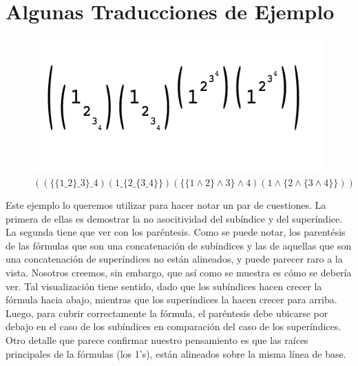 \newpage

\section{Algunas Traducciones de Ejemplo}

\begin{figure}[H]
      \begin{centering}
        \includegraphics{imgs/a}
        \caption{$((\{\{1\_2\}\_3\}\_4)(1\_\{2\_\{3\_4\}\})(\{\{1\wedge2\}\wedge3\}\wedge4)(1\wedge\{2\wedge\{3\wedge4\}\}))$}
       \end{centering}
\end{figure}

\indent Este ejemplo lo queremos utilizar para hacer notar un par de cuestiones. La primera de ellas es demostrar la no asocitividad del subíndice y del superíndice. La segunda tiene que ver con los paréntesis. Como se puede notar, los parentésis de las fórmulas que son una concatenación de subíndices y las de aquellas que son una concatenación de superíndices no están alineados, y puede parecer raro a la vista. Nosotros creemos, sin embargo, que así como se muestra es cómo se debería ver. Tal visualización tiene sentido, dado que los subíndices hacen crecer la fórmula hacia abajo, mientras que los superíndices la hacen crecer para arriba. Luego, para cubrir correctamente la fórmula, el paréntesis debe ubicarse por debajo en el caso de los subíndices en comparación del caso de los superíndices. Otro detalle que parece confirmar nuestro pensamiento es que las raíces principales de la fórmulas (los 1's), están alineados sobre la misma línea de base.\\

